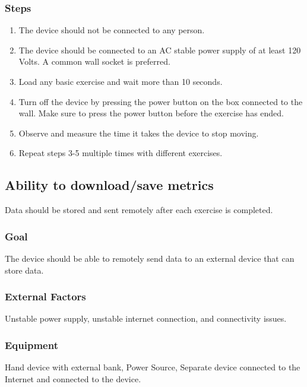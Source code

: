 \documentclass{article}
\begin{document}
\subsubsection{Steps}
\begin{enumerate}
\item The device should not be connected to any person.
\item The device should be connected to an AC stable power supply of at least 120 Volts. A common wall socket is preferred.
\item Load any basic exercise and wait more than 10 seconds.
\item Turn off the device by pressing the power button on the box connected to the wall. Make sure to press the power button before the exercise has ended.
\item Observe and measure the time it takes the device to stop moving.
\item Repeat steps 3-5 multiple times with different exercises.
\end{enumerate}

\subsection{Ability to download/save metrics}
Data should be stored and sent remotely after each exercise is completed.

\subsubsection{Goal} The device should be able to remotely send data to an external device that can store data.

\subsubsection{External Factors} Unstable power supply, unstable internet connection, and connectivity issues.

\subsubsection{Equipment} Hand device with external bank, Power Source, Separate device connected to the Internet and connected to the device.
\end{document}
